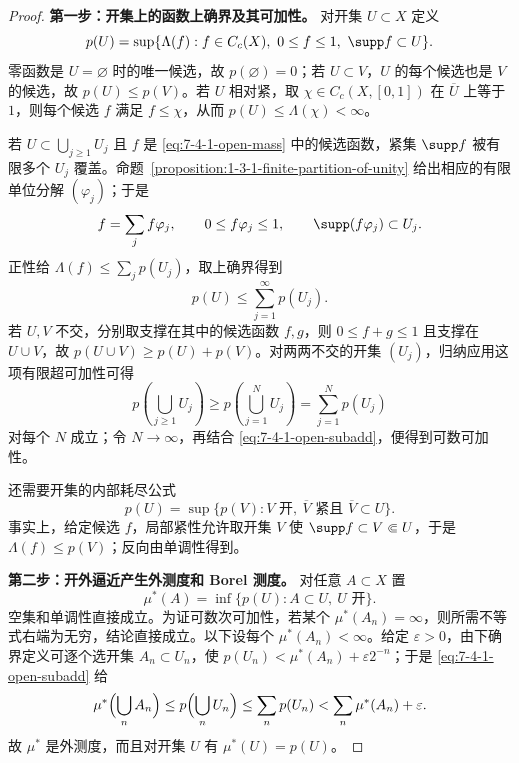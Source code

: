 \begin{proof}
\textbf{第一步：开集上的函数上确界及其可加性。}
对开集 $U\subset X$ 定义
\begin{equation}\label{eq:7-4-1-open-mass}
 p(U)=\sup\{\Lambda(f):f\in C_c(X),\ 0\le f\le1,\ \supp f\subset U\}.
\end{equation}
零函数是 $U=\varnothing$ 时的唯一候选，故 $p(\varnothing)=0$；若 $U\subset V$，$U$ 的每个候选也是
$V$ 的候选，故 $p(U)\le p(V)$。若 $U$ 相对紧，取
$\chi\in C_c(X,[0,1])$ 在 $\overline U$ 上等于 $1$，则每个候选 $f$ 满足 $f\le\chi$，从而
$p(U)\le\Lambda(\chi)<\infty$。

若 $U\subset\bigcup_{j\ge1}U_j$ 且 $f$ 是 \eqref{eq:7-4-1-open-mass} 中的候选函数，紧集
$\supp f$ 被有限多个 $U_j$ 覆盖。命题~\ref{proposition:1-3-1-finite-partition-of-unity}
给出相应的有限单位分解 $(\varphi_j)$；于是
\[
 f=\sum_jf\varphi_j,\qquad
 0\le f\varphi_j\le1,\qquad
 \supp(f\varphi_j)\subset U_j.
\]
正性给 $\Lambda(f)\le\sum_jp(U_j)$，取上确界得到
\begin{equation}\label{eq:7-4-1-open-subadd}
 p(U)\le\sum_{j=1}^\infty p(U_j).
\end{equation}
若 $U,V$ 不交，分别取支撑在其中的候选函数 $f,g$，则 $0\le f+g\le1$ 且支撑在 $U\cup V$，故
$p(U\cup V)\ge p(U)+p(V)$。对两两不交的开集 $(U_j)$，归纳应用这项有限超可加性可得
\[
 p\left(\bigcup_{j\geq1}U_j\right)
 \geq p\left(\bigcup_{j=1}^NU_j\right)
 =\sum_{j=1}^Np(U_j)
\]
对每个 $N$ 成立；令 $N\to\infty$，再结合 \eqref{eq:7-4-1-open-subadd}，便得到可数可加性。

还需要开集的内部耗尽公式
\begin{equation}\label{eq:7-4-1-open-inner-p}
 p(U)=\sup\{p(V):V\text{ 开},\ \overline V\text{ 紧且 }\overline V\subset U\}.
\end{equation}
事实上，给定候选 $f$，局部紧性允许取开集 $V$ 使
$\supp f\subset V\Subset U$，于是 $\Lambda(f)\le p(V)$；反向由单调性得到。

\textbf{第二步：开外逼近产生外测度和 Borel 测度。}
对任意 $A\subset X$ 置
\begin{equation}\label{eq:7-4-1-riesz-outer}
 \mu^*(A)=\inf\{p(U):A\subset U,\ U\text{ 开}\}.
\end{equation}
空集和单调性直接成立。为证可数次可加性，若某个
$\mu^*(A_n)=\infty$，则所需不等式右端为无穷，结论直接成立。以下设每个
$\mu^*(A_n)<\infty$。给定 $\varepsilon>0$，由下确界定义可逐个选开集
$A_n\subset U_n$，使
$p(U_n)<\mu^*(A_n)+\varepsilon2^{-n}$；于是
\eqref{eq:7-4-1-open-subadd} 给
\[
 \mu^*\Bigl(\bigcup_nA_n\Bigr)
 \le p\Bigl(\bigcup_nU_n\Bigr)
 \le\sum_np(U_n)
 <\sum_n\mu^*(A_n)+\varepsilon.
\]
故 $\mu^*$ 是外测度，而且对开集 $U$ 有 $\mu^*(U)=p(U)$。


\end{proof}
